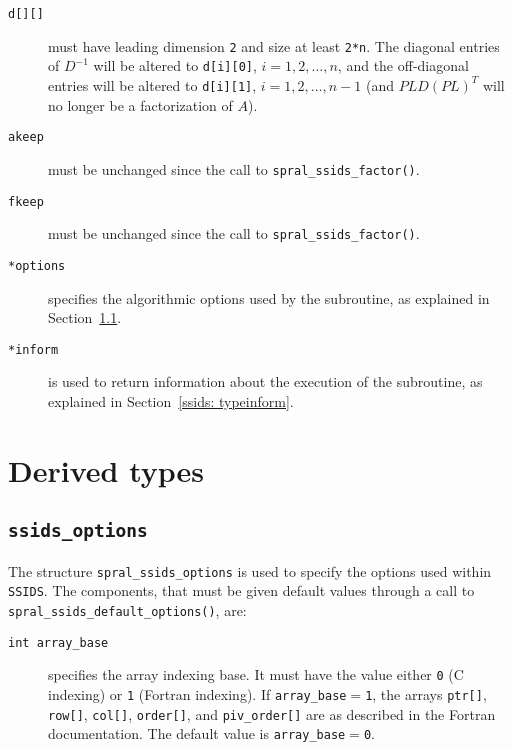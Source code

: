 \begin{description}

\item[\texttt{d[][]}] must have leading dimension \texttt{2} and size at
   least \texttt{2*n}. The diagonal entries of ${D}^{-1}$ will be altered to
   {\tt d[i][0]}, $i = 1,2,\ldots,n$, and the off-diagonal entries will be
   altered to {\tt d[i][1]}, $i = 1,2,\ldots,n-1$ (and $PLD(PL)^T$ will no
   longer be a factorization of $A$).

\item[\texttt{akeep}] must be unchanged since the call to
   {\tt spral\_ssids\_factor()}.

\item[\texttt{fkeep}] must be unchanged since the call to
   {\tt spral\_ssids\_factor()}.

\item[\texttt{*options}] specifies the algorithmic options used by the
   subroutine, as explained in Section~\ref{ssids: typeoptions}.

\item[\texttt{*inform}] is used to return information about the execution
   of the subroutine, as explained in Section~\ref{ssids: typeinform}.

\end{description}


\section{Derived types}
\subsection{\texttt{ssids\_options}}
\label{ssids: typeoptions}

The structure {\tt spral\_ssids\_options} is used to specify the options used
within \texttt{SSIDS}. The components, that must be given default values through
a call to \texttt{spral\_ssids\_default\_options()}, are: \\



\begin{description}
\item[\texttt{int array\_base}] specifies the array indexing base. It must
   have the value either \texttt{0} (C indexing) or \texttt{1} (Fortran
   indexing). If \texttt{array\_base}$=$\texttt{1}, the arrays \texttt{ptr[]},
   \texttt{row[]}, \texttt{col[]}, \texttt{order[]}, and \texttt{piv\_order[]}
   are as described in the Fortran documentation.
   The default value is \texttt{array\_base}$=$\texttt{0}.
\end{description}

